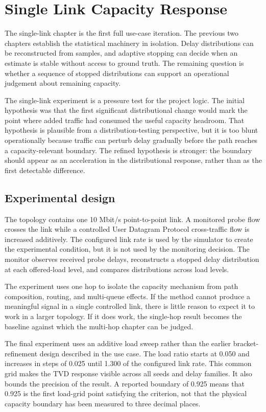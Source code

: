 \documentclass[a4paper,11pt]{report}
\begin{document}
\chapter{Single Link Capacity Response}
\label{sec:eval-capacity-use-case}

The single-link chapter is the first full use-case iteration. The previous two chapters establish the statistical machinery in isolation. Delay distributions can be reconstructed from samples, and adaptive stopping can decide when an estimate is stable without access to ground truth. The remaining question is whether a sequence of stopped distributions can support an operational judgement about remaining capacity.

The single-link experiment is a pressure test for the project logic. The initial hypothesis was that the first significant distributional change would mark the point where added traffic had consumed the useful capacity headroom. That hypothesis is plausible from a distribution-testing perspective, but it is too blunt operationally because traffic can perturb delay gradually before the path reaches a capacity-relevant boundary. The refined hypothesis is stronger: the boundary should appear as an acceleration in the distributional response, rather than as the first detectable difference.

\section{Experimental design}

The topology contains one 10 Mbit/s point-to-point link. A monitored probe flow crosses the link while a controlled User Datagram Protocol cross-traffic flow is increased additively. The configured link rate is used by the simulator to create the experimental condition, but it is not used by the monitoring decision. The monitor observes received probe delays, reconstructs a stopped delay distribution at each offered-load level, and compares distributions across load levels.

The experiment uses one hop to isolate the capacity mechanism from path composition, routing, and multi-queue effects. If the method cannot produce a meaningful signal in a single controlled link, there is little reason to expect it to work in a larger topology. If it does work, the single-hop result becomes the baseline against which the multi-hop chapter can be judged.

The final experiment uses an additive load sweep rather than the earlier bracket-refinement design described in the use case. The load ratio starts at 0.050 and increases in steps of 0.025 until 1.300 of the configured link rate. This common grid makes the TVD response visible across all seeds and delay families. It also bounds the precision of the result. A reported boundary of 0.925 means that 0.925 is the first load-grid point satisfying the criterion, not that the physical capacity boundary has been measured to three decimal places.
\end{document}
